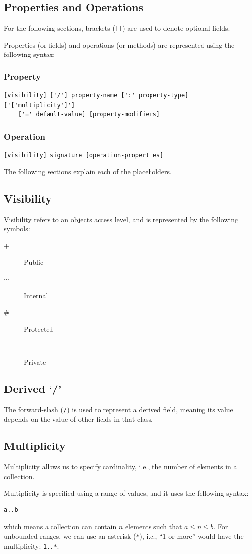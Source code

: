 \documentclass{article}
\begin{document}
\subsection{Properties and Operations}
For the following sections, brackets (\lstinline{[]}) are used to denote optional fields.

Properties (or fields) and operations (or methods) are represented using the following syntax:
\subsubsection{Property}
\begin{lstlisting}[numbers=none]
[visibility] ['/'] property-name [':' property-type] ['['multiplicity']'] 
    ['=' default-value] [property-modifiers]
\end{lstlisting}
\subsubsection{Operation}
\begin{lstlisting}[numbers=none]
[visibility] signature [operation-properties]
\end{lstlisting}
The following sections explain each of the placeholders.
\subsection{Visibility}
Visibility refers to an objects access level, and is represented by the following symbols:
\begin{description}
    \item[\(+\)] Public
    \item[\(\sim\)] Internal
    \item[\(\#\)] Protected
    \item[\(-\)] Private
\end{description}
\subsection{Derived `/'}
The forward-slash (\lstinline{/}) is used to represent a derived field, meaning its value depends on
the value of other fields in that class.
\subsection{Multiplicity}
Multiplicity allows us to specify cardinality, i.e., the number of elements in a collection.

Multiplicity is specified using a range of values, and it uses the following syntax:
\begin{lstlisting}[numbers=none]
a..b
\end{lstlisting}
which means a collection can contain \(n\) elements such that \(a \leq n \leq b\).
For unbounded ranges, we can use an asterisk (\lstinline{*}), i.e.,
``1 or more'' would have the multiplicity: \lstinline{1..*}.
\end{document}
